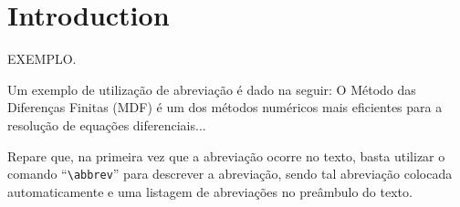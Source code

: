 \chapter{Introduction}

EXEMPLO.

Um exemplo de utilização de abreviação é dado na seguir: O Método das Diferenças Finitas
(MDF) é um dos métodos numéricos mais eficientes
para a resolução de equações diferenciais...

Repare que, na primeira vez que a abreviação ocorre no texto, basta utilizar o comando
``\verb|\abbrev|'' para descrever a abreviação, sendo tal abreviação colocada automaticamente
e uma listagem de abreviações no preâmbulo do texto.

\citet{book-example}

